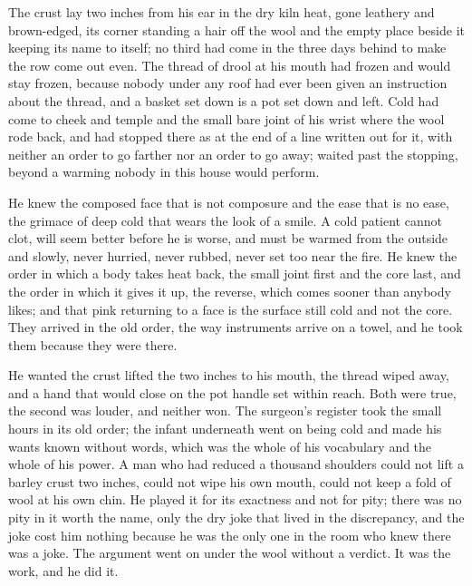 The crust lay two inches from his ear in the dry kiln heat, gone leathery and brown-edged, its corner standing a hair off the wool and the empty place beside it keeping its name to itself; no third had come in the three days behind to make the row come out even. The thread of drool at his mouth had frozen and would stay frozen, because nobody under any roof had ever been given an instruction about the thread, and a basket set down is a pot set down and left. Cold had come to cheek and temple and the small bare joint of his wrist where the wool rode back, and had stopped there as at the end of a line written out for it, with neither an order to go farther nor an order to go away;  waited past the stopping, beyond a warming nobody in this house would perform.

He knew the composed face that is not composure and the ease that is no ease, the grimace of deep cold that wears the look of a smile. A cold patient cannot clot, will seem better before he is worse, and must be warmed from the outside and slowly, never hurried, never rubbed, never set too near the fire. He knew the order in which a body takes heat back, the small joint first and the core last, and the order in which it gives it up, the reverse, which comes sooner than anybody likes; and that pink returning to a face is the surface still cold and not the core. They arrived in the old order, the way instruments arrive on a towel, and he took them because they were there.

He wanted the crust lifted the two inches to his mouth, the thread wiped away, and a hand that would close on the pot handle set within reach. Both were true, the second was louder, and neither won. The surgeon's register took the small hours in its old order; the infant underneath went on being cold and made his wants known without words, which was the whole of his vocabulary and the whole of his power. A man who had reduced a thousand shoulders could not lift a barley crust two inches, could not wipe his own mouth, could not keep a fold of wool at his own chin. He played it for its exactness and not for pity; there was no pity in it worth the name, only the dry joke that lived in the discrepancy, and the joke cost him nothing because he was the only one in the room who knew there was a joke. The argument went on under the wool without a verdict. It was the work, and he did it.

\scenebreak

